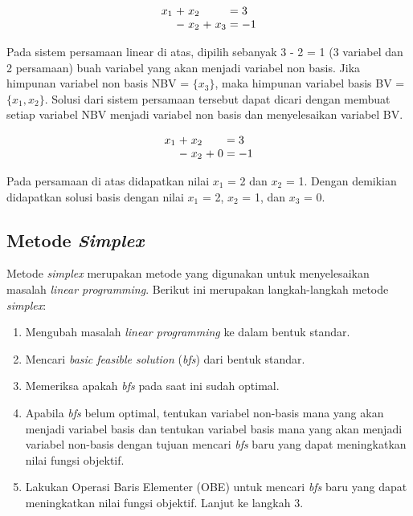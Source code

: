 \begin{equation*}
	\setlength\arraycolsep{1.5pt}
	\begin{array}{r c r c r c l}
		x_1 &+ &x_2 &  &    &= &3\\
		    &- &x_2 &+ &x_3 &= &-1
	\end{array}
\end{equation*}

Pada sistem persamaan linear di atas, dipilih sebanyak 3 - 2 = 1 (3 variabel dan 2 persamaan) buah variabel yang akan menjadi variabel non basis. Jika himpunan variabel non basis NBV = \(\{x_3\}\), maka himpunan variabel basis BV = \(\{x_1, x_2\}\). Solusi dari sistem persamaan tersebut dapat dicari dengan membuat setiap variabel NBV menjadi variabel non basis dan menyelesaikan variabel BV.

\begin{equation*}
	\setlength\arraycolsep{1.5pt}
	\begin{array}{r c r c r c l}
		x_1 &+ &x_2 &  &    &= &3\\
		    &- &x_2 &+ &0 &= &-1
	\end{array}
\end{equation*}

Pada persamaan di atas didapatkan nilai \(x_1\) = 2 dan \(x_2\) = 1. Dengan demikian didapatkan solusi basis dengan nilai \(x_1\) = 2, \(x_2\) = 1, dan \(x_3\) = 0.

\subsection{Metode \textit{Simplex}}
Metode \textit{simplex} merupakan metode yang digunakan untuk menyelesaikan masalah \textit{linear programming}. Berikut ini merupakan langkah-langkah metode \textit{simplex}:
\begin{enumerate}
	\item Mengubah masalah \textit{linear programming} ke dalam bentuk standar.
	\item Mencari \textit{basic feasible solution} (\textit{bfs}) dari bentuk standar.
	\item Memeriksa apakah \textit{bfs} pada saat ini sudah optimal.
	\item Apabila \textit{bfs} belum optimal, tentukan variabel non-basis mana yang akan menjadi variabel basis dan tentukan variabel basis mana yang akan menjadi variabel non-basis dengan tujuan mencari \textit{bfs} baru yang dapat meningkatkan nilai fungsi objektif.
	\item Lakukan Operasi Baris Elementer (OBE) untuk mencari \textit{bfs} baru yang dapat meningkatkan nilai fungsi objektif. Lanjut ke langkah 3.
\end{enumerate}

